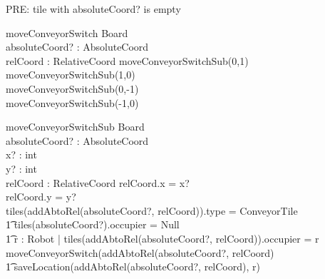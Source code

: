 \documentclass[a4paper,11pt]{article}
\begin{document}
PRE: tile with absoluteCoord? is empty
\begin{schema}{moveConveyorSwitch}
\Delta Board \\
absoluteCoord? : AbsoluteCoord \\
relCoord : RelativeCoord
\where
moveConveyorSwitchSub(0,1) \\
moveConveyorSwitchSub(1,0) \\
moveConveyorSwitchSub(0,-1) \\
moveConveyorSwitchSub(-1,0) \\
\end{schema}

\begin{schema}{moveConveyorSwitchSub}
\Delta Board \\
absoluteCoord? : AbsoluteCoord \\
x? : int \\
y? : int \\
relCoord : RelativeCoord
\where
relCoord.x = x? \\
relCoord.y = y? \\
\IF tiles(addAbtoRel(absoluteCoord?, relCoord)).type = ConveyorTile \\ \t1
tiles(absoluteCoord?).occupier = Null \\ \t1
\exists r : Robot | tiles(addAbtoRel(absoluteCoord?, relCoord)).occupier = r \\
\THEN moveConveyorSwitch(addAbtoRel(absoluteCoord?, relCoord)\\ \t1
saveLocation(addAbtoRel(absoluteCoord?, relCoord), r)
\end{schema}
\end{document}
